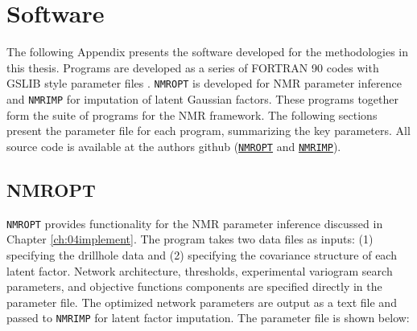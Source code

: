 
\chapter{Software}
\label{ch:Asoftware}

The following Appendix presents the software developed for the methodologies in this thesis. Programs are developed as a series of FORTRAN 90 codes with \gls{GSLIB} style parameter files \citep{deutsch1992geostatistical}. \texttt{NMROPT} is developed for \gls{NMR} parameter inference and \texttt{NMRIMP} for imputation of latent Gaussian factors. These programs together form the suite of programs for the \gls{NMR} framework. The following sections present the parameter file for each program, summarizing the key parameters. All source code is available at the authors github (\href{https://github.com/benjiharding/NMROPT}{\texttt{NMROPT}} and \href{https://github.com/benjiharding/NMRIMP}{\texttt{NMRIMP}}).


\section{NMROPT}
\label{sect:Anmropt}

\texttt{NMROPT} provides functionality for the \gls{NMR} parameter inference discussed in Chapter \ref{ch:04implement}. The program takes two data files as inputs: (1) specifying the drillhole data and (2) specifying the covariance structure of each latent factor. Network architecture, thresholds, experimental variogram search parameters, and objective functions components are specified directly in the parameter file. The optimized network parameters are output as a text file and passed to \texttt{NMRIMP} for latent factor imputation. The parameter file is shown below:


